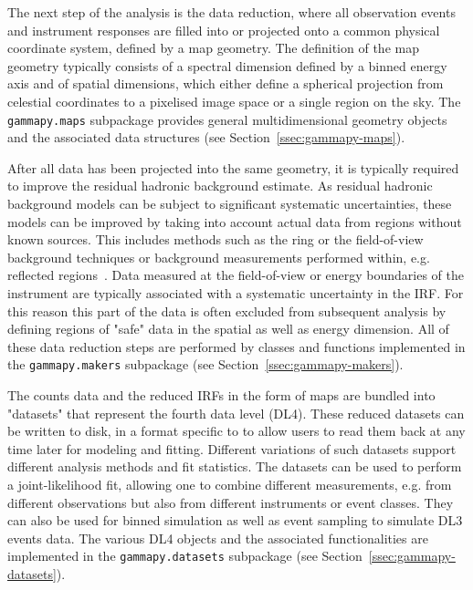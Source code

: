\documentclass[traditabstract, longauth]{aa}
\newcommand{\code}[1]{\texttt{#1}}
\begin{document}
The next step of the analysis is the data reduction, where all observation events and instrument
responses are filled into or projected onto a common physical coordinate system, defined by
a map geometry. The definition of the map geometry typically consists of a spectral dimension
defined by a binned energy axis and of spatial dimensions, which either define 
a spherical projection from celestial coordinates to a pixelised image space
or a single region on the sky. The \code{gammapy.maps} subpackage provides
general multidimensional geometry objects and the associated data structures
(see Section~\ref{ssec:gammapy-maps}).

After all data has been projected into the same geometry, it is typically
required to improve the residual hadronic background estimate. As residual hadronic
background models can be subject to significant systematic uncertainties,
these models can be improved by taking into account actual data
from regions without known \gammaray sources. This includes methods 
such as the ring or the field-of-view background techniques or
background measurements performed within, e.g. reflected regions~\citep{Berge07}.
Data measured at the field-of-view or energy boundaries of the instrument are typically
associated with a systematic uncertainty in the IRF. For this reason this part 
of the data is often excluded from subsequent analysis by defining regions of
 "safe" data in the spatial as well as energy dimension.
All of these data reduction steps are performed by classes and functions
implemented in the \code{gammapy.makers} subpackage (see Section~\ref{ssec:gammapy-makers}).

The counts data and the reduced IRFs in the form of maps are bundled into "datasets"
that represent the fourth data level (DL4). These reduced datasets can be written to disk,
in a format specific to \gammapy to allow users to read them back at any time later
for modeling and fitting. Different variations of such datasets support different 
analysis methods and fit statistics. The datasets can be used to perform a joint-likelihood
fit, allowing one to combine different measurements, e.g. from different observations
but also from different instruments or event classes. They can also be used for binned
simulation as well as event sampling to simulate DL3 events data.
The various DL4 objects and the associated functionalities are
implemented in the \code{gammapy.datasets} subpackage (see Section~\ref{ssec:gammapy-datasets}).
\end{document}
